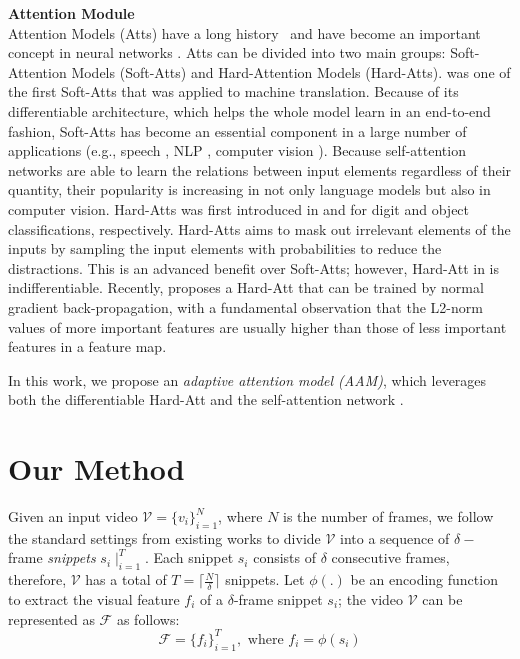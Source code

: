 \documentclass[sn-mathphys]{sn-jnl}
\theoremstyle{thmstyleone}\newtheorem{theorem}{Theorem}\newtheorem{proposition}[theorem]{Proposition}
\theoremstyle{thmstyletwo}\newtheorem{example}{Example}\newtheorem{remark}{Remark}
\theoremstyle{thmstylethree}\newtheorem{definition}{Definition}
\begin{document}
\vspace{0.2cm}
\noindent
\textbf{Attention Module} \\
Attention Models (Atts) have a long history~\cite{itti1998model} and have become an important concept in neural networks \cite{chaudhari2021attentive}. Atts can be divided into two main groups: Soft-Attention Models (Soft-Atts) and Hard-Attention Models (Hard-Atts). \cite{bahdanau2014neural} was one of the first Soft-Atts that was applied to machine translation. Because of its differentiable architecture, which helps the whole model learn in an end-to-end fashion, Soft-Atts has become an essential component in a large number of applications (e.g., speech \cite{cho2015describing}, NLP \cite{galassi2020attention}, computer vision \cite{chaudhari2019attentive}).
Because self-attention networks \cite{attention_is_all_you_need} are able to learn the relations between input elements regardless of their quantity, their popularity is increasing in not only language models but also in computer vision.
Hard-Atts was first introduced in \cite{xu2015show} and \cite{Saccader_NIPS2019} for digit and object classifications, respectively. 
Hard-Atts aims to mask out irrelevant elements of the inputs by sampling the input elements with probabilities to reduce the distractions. This is an advanced benefit over Soft-Atts; however, Hard-Att in \cite{xu2015show} is indifferentiable. Recently, \cite{patro2018differential} proposes a Hard-Att that can be trained by normal gradient back-propagation, with a fundamental observation that the L2-norm values of more important features are usually higher than those of less important features in a feature map.

In this work, we propose an \emph{adaptive attention model (AAM)}, which leverages both the differentiable Hard-Att \cite{patro2018differential} and the self-attention network \cite{attention_is_all_you_need}.


\section{Our Method}


Given an input video $\mathcal{V}=\{v_i\}_{i=1}^{N}$, where $N$ is the number of frames, we follow the standard settings from existing works to divide $\mathcal{V}$ into a sequence of $\delta-$frame \textit{snippets} $s_i\mid_{i=1}^T$. Each snippet $s_i$ consists of $\delta$ consecutive frames, therefore, $\mathcal{V}$ has a total of $T=\bigr\lceil \frac{N}{\delta} \bigr\rceil$ snippets. Let $\phi(.)$ be an encoding function to extract the visual feature $f_i$ of a $\delta$-frame snippet $s_i$; the video $\mathcal{V}$ can be represented as $\mathcal{F}$ as follows:
\begin{equation}
        \mathcal{F} =\{f_i\}_{i=1}^{T}, \text{ where } f_i  =\phi(s_i) 
\end{equation}
\end{document}
